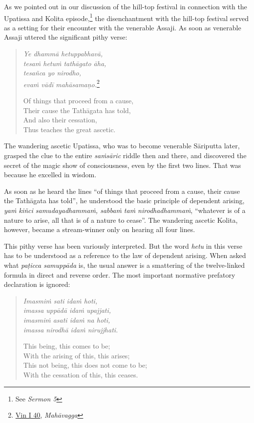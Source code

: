 As we pointed out in our discussion of the hill-top festival in connection with the Upatissa and Kolita episode,\footnote{See \emph{Sermon 5}} the disenchantment with the hill-top festival served as a setting for their encounter with the venerable Assaji. As soon as venerable Assaji uttered the significant pithy verse:

\begin{quote}
\emph{Ye dhammā hetuppabhavā,}\\
\emph{tesaṁ hetuṁ tathāgato āha,}\\
\emph{tesañca yo nirodho,}\\
\emph{evaṁ vādī mahāsamaṇo.}\footnote{\href{https://suttacentral.net/pli-tv-kd1/pli/ms}{Vin I 40}, \emph{Mahāvagga}}

Of things that proceed from a cause,\\
Their cause the Tathāgata has told,\\
And also their cessation,\\
Thus teaches the great ascetic.
\end{quote}

The wandering ascetic Upatissa, who was to become venerable Sāriputta later, grasped the clue to the entire \emph{saṁsāric} riddle then and there, and discovered the secret of the magic show of consciousness, even by the first two lines. That was because he excelled in wisdom.

As soon as he heard the lines ``of things that proceed from a cause, their cause the Tathāgata has told'', he understood the basic principle of dependent arising, \emph{yaṁ kiñci samudayadhammaṁ, sabbaṁ taṁ nirodhadhammaṁ}, ``whatever is of a nature to arise, all that is of a nature to cease''. The wandering ascetic Kolita, however, became a stream-winner only on hearing all four lines.

This pithy verse has been variously interpreted. But the word \emph{hetu} in this verse has to be understood as a reference to the law of dependent arising. When asked what \emph{paṭicca samuppāda} is, the usual answer is a smattering of the twelve-linked formula in direct and reverse order. The most important normative prefatory declaration is ignored:

\begin{quote}
\emph{Imasmiṁ sati idaṁ hoti,}\\
\emph{imassa uppādā idaṁ upajjati,}\\
\emph{imasmiṁ asati idaṁ na hoti,}\\
\emph{imassa nirodhā idaṁ nirujjhati.}

This being, this comes to be;\\
With the arising of this, this arises;\\
This not being, this does not come to be;\\
With the cessation of this, this ceases.
\end{quote}

